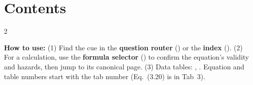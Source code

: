 \clearpage
{}
{\small
\renewcommand{\contentsname}{Contents}
\makeatletter
\renewcommand\tableofcontents{%
  \section*{\contentsname}\vspace{-4pt}%
  \begin{multicols}{2}\end{multicols}}
\makeatother
\tableofcontents}
\vspace{4pt}
\textbf{How to use:} (1) Find the cue in the \textbf{question router} () or the \textbf{index} (). (2) For a calculation, use the \textbf{formula selector} () to confirm the equation's validity and hazards, then jump to its canonical page. (3) Data tables: , . Equation and table numbers start with the tab number (Eq.\ (3.20) is in Tab~3).
